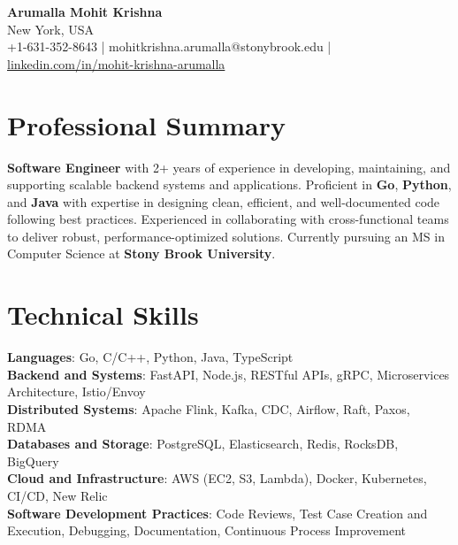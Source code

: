 \documentclass[letterpaper,11pt]{article}
\begin{document}
\begin{center}
  {\Large \textbf{Arumalla Mohit Krishna}} \\
  New York, USA \\
  +1-631-352-8643 \enspace | \enspace mohitkrishna.arumalla@stonybrook.edu \enspace | \enspace \href{https://www.linkedin.com/in/mohit-krishna-arumalla}{linkedin.com/in/mohit-krishna-arumalla}
\end{center}

\section{Professional Summary}
  \begin{itemize}[leftmargin=0.15in, label={}]
    \small{\item{
     \textbf{Software Engineer} with 2+ years of experience in developing, maintaining, and supporting scalable backend systems and applications. Proficient in \textbf{Go}, \textbf{Python}, and \textbf{Java} with expertise in designing clean, efficient, and well-documented code following best practices. Experienced in collaborating with cross-functional teams to deliver robust, performance-optimized solutions. Currently pursuing an MS in Computer Science at \textbf{Stony Brook University}.
    }}
  \end{itemize}
\vspace{-16pt}

\section{Technical Skills}
 \begin{itemize}[leftmargin=0.15in, label={}]
    \small{\item{
     \textbf{Languages}: Go, C/C++, Python, Java, TypeScript \\
     \textbf{Backend and Systems}: FastAPI, Node.js, RESTful APIs, gRPC, Microservices Architecture, Istio/Envoy \\
     \textbf{Distributed Systems}: Apache Flink, Kafka, CDC, Airflow, Raft, Paxos, RDMA \\
     \textbf{Databases and Storage}: PostgreSQL, Elasticsearch, Redis, RocksDB, BigQuery \\
     \textbf{Cloud and Infrastructure}: AWS (EC2, S3, Lambda), Docker, Kubernetes, CI/CD, New Relic \\
     \textbf{Software Development Practices}: Code Reviews, Test Case Creation and Execution, Debugging, Documentation, Continuous Process Improvement
    }}
 \end{itemize}
\vspace{-16pt}
\end{document}
